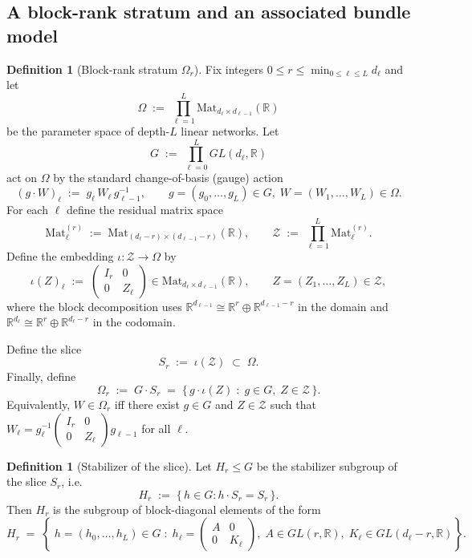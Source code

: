 \documentclass{article}
\newcommand{\R}{\mathbb{R}}
\newcommand{\Mat}{\mathrm{Mat}}
\theoremstyle{definition}
\newtheorem{definition}[theorem]{Definition}
\begin{document}
\subsection{A block-rank stratum and an associated bundle model}

\begin{definition}[Block-rank stratum $\Omega_r$]\label{def:Omega_r}
Fix integers $0\le r\le \min_{0\le \ell\le L} d_\ell$ and let
\[
\Omega \;:=\; \prod_{\ell=1}^L \Mat_{d_\ell\times d_{\ell-1}}(\R)
\]
be the parameter space of depth-$L$ linear networks.
Let
\[
G \;:=\; \prod_{\ell=0}^L GL(d_\ell,\R)
\]
act on $\Omega$ by the standard change-of-basis (gauge) action
\begin{equation}\label{eq:gauge-action}
(g\cdot W)_\ell \;:=\; g_\ell\, W_\ell\, g_{\ell-1}^{-1},
\qquad
g=(g_0,\dots,g_L)\in G,\; W=(W_1,\dots,W_L)\in\Omega.
\end{equation}
For each $\ell$ define the residual matrix space
\[
\Mat^{(r)}_\ell \;:=\; \Mat_{(d_\ell-r)\times(d_{\ell-1}-r)}(\R),
\qquad
\mathcal Z \;:=\; \prod_{\ell=1}^L \Mat^{(r)}_\ell.
\]
Define the embedding $\iota:\mathcal Z\to\Omega$ by
\begin{equation}\label{eq:iota-embed}
\iota(Z)_\ell \;:=\;
\begin{pmatrix}
I_r & 0\\
0 & Z_\ell
\end{pmatrix}
\in \Mat_{d_\ell\times d_{\ell-1}}(\R),
\qquad Z=(Z_1,\dots,Z_L)\in\mathcal Z,
\end{equation}
where the block decomposition uses $\R^{d_{\ell-1}}\cong \R^r\oplus \R^{d_{\ell-1}-r}$ in the domain and
$\R^{d_\ell}\cong \R^r\oplus \R^{d_\ell-r}$ in the codomain.

Define the slice
\[
S_r \;:=\; \iota(\mathcal Z)\;\subset\;\Omega.
\]
Finally, define
\begin{equation}\label{eq:Omega_r-def}
\Omega_r \;:=\; G\cdot S_r \;=\; \{\, g\cdot \iota(Z)\;:\; g\in G,\; Z\in\mathcal Z\,\}.
\end{equation}
Equivalently, $W\in\Omega_r$ iff there exist $g\in G$ and $Z\in\mathcal Z$ such that
$W_\ell = g_\ell^{-1}\begin{pmatrix}I_r&0\\0&Z_\ell\end{pmatrix} g_{\ell-1}$ for all $\ell$.
\end{definition}

\medskip

\begin{definition}[Stabilizer of the slice]\label{def:Hr}
Let $H_r\le G$ be the stabilizer subgroup of the slice $S_r$, i.e.
\[
H_r \;:=\; \{\,h\in G : h\cdot S_r = S_r\,\}.
\]
Then $H_r$ is the subgroup of block-diagonal elements of the form
\begin{equation}\label{eq:Hr-form}
H_r \;=\;
\left\{\;
h=(h_0,\dots,h_L)\in G \;:\;
h_\ell=
\begin{pmatrix}
A & 0\\
0 & K_\ell
\end{pmatrix},\;
A\in GL(r,\mathbb{R}),\;K_\ell\in GL(d_\ell-r,\mathbb{R})
\right\}.
\end{equation}
\end{definition}
\end{document}
